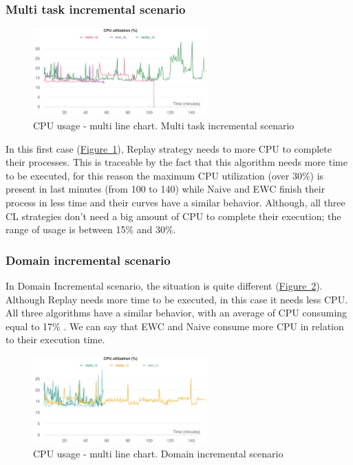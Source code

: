 \documentclass[english, LaM, oneside]{sapthesis}%
\begin{document}
\subsubsection{Multi task incremental scenario}
\begin{figure}[!h]
  
     \centering
     \includegraphics[width=0.60\textwidth]{overview cpu utilization nc.png}
     \caption{CPU usage - multi line chart. Multi task incremental scenario}\label{Fig:104}
   
   
\end{figure}
In this first case (\hyperref[Fig:104]{Figure~\ref*{Fig:104}}), Replay strategy needs to more CPU to complete their processes. This is traceable by the fact that this algorithm needs more time to be executed, for this reason the maximum CPU utilization (over 30\%) is present in last minutes (from 100 to 140) while Naive and EWC finish their process in less time and their curves have a similar behavior. Although, all three CL strategies don't need a big amount of CPU to complete their execution; the range of usage is between 15\% and 30\%.

\subsubsection{Domain incremental scenario}
In Domain Incremental scenario, the situation is quite different (\hyperref[Fig:105]{Figure~\ref*{Fig:105}}). Although Replay needs more time to be executed, in this case it needs less CPU. All three algorithms have a similar behavior, with an average of CPU consuming equal to 17\% . We can say that EWC and Naive consume more CPU in relation to their execution time.
\begin{figure}[!h]
  
     \centering
     \includegraphics[width=0.60\textwidth]{overview cpu utilization ni.png}
     \caption{CPU usage - multi line chart. Domain incremental scenario}\label{Fig:105}
   
   
\end{figure}
\end{document}
